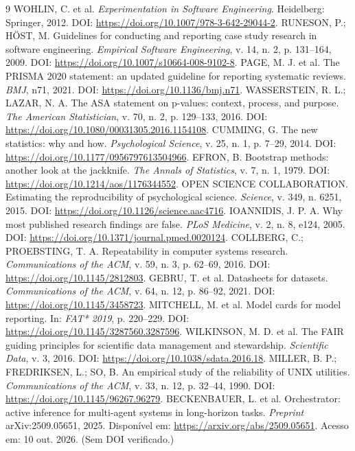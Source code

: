 \begin{thebibliography}{9}
 WOHLIN, C. et al. \textit{Experimentation in Software Engineering}. Heidelberg: Springer, 2012. DOI: \url{https://doi.org/10.1007/978-3-642-29044-2}.
 RUNESON, P.; HÖST, M. Guidelines for conducting and reporting case study research in software engineering. \textit{Empirical Software Engineering}, v. 14, n. 2, p. 131--164, 2009. DOI: \url{https://doi.org/10.1007/s10664-008-9102-8}.
 PAGE, M. J. et al. The PRISMA 2020 statement: an updated guideline for reporting systematic reviews. \textit{BMJ}, n71, 2021. DOI: \url{https://doi.org/10.1136/bmj.n71}.
 WASSERSTEIN, R. L.; LAZAR, N. A. The ASA statement on p-values: context, process, and purpose. \textit{The American Statistician}, v. 70, n. 2, p. 129--133, 2016. DOI: \url{https://doi.org/10.1080/00031305.2016.1154108}.
 CUMMING, G. The new statistics: why and how. \textit{Psychological Science}, v. 25, n. 1, p. 7--29, 2014. DOI: \url{https://doi.org/10.1177/0956797613504966}.
 EFRON, B. Bootstrap methods: another look at the jackknife. \textit{The Annals of Statistics}, v. 7, n. 1, 1979. DOI: \url{https://doi.org/10.1214/aos/1176344552}.
 OPEN SCIENCE COLLABORATION. Estimating the reproducibility of psychological science. \textit{Science}, v. 349, n. 6251, 2015. DOI: \url{https://doi.org/10.1126/science.aac4716}.
 IOANNIDIS, J. P. A. Why most published research findings are false. \textit{PLoS Medicine}, v. 2, n. 8, e124, 2005. DOI: \url{https://doi.org/10.1371/journal.pmed.0020124}.
 COLLBERG, C.; PROEBSTING, T. A. Repeatability in computer systems research. \textit{Communications of the ACM}, v. 59, n. 3, p. 62--69, 2016. DOI: \url{https://doi.org/10.1145/2812803}.
 GEBRU, T. et al. Datasheets for datasets. \textit{Communications of the ACM}, v. 64, n. 12, p. 86--92, 2021. DOI: \url{https://doi.org/10.1145/3458723}.
 MITCHELL, M. et al. Model cards for model reporting. In: \textit{FAT* 2019}, p. 220--229. DOI: \url{https://doi.org/10.1145/3287560.3287596}.
 WILKINSON, M. D. et al. The FAIR guiding principles for scientific data management and stewardship. \textit{Scientific Data}, v. 3, 2016. DOI: \url{https://doi.org/10.1038/sdata.2016.18}.
 MILLER, B. P.; FREDRIKSEN, L.; SO, B. An empirical study of the reliability of UNIX utilities. \textit{Communications of the ACM}, v. 33, n. 12, p. 32--44, 1990. DOI: \url{https://doi.org/10.1145/96267.96279}.
 BECKENBAUER, L. et al. Orchestrator: active inference for multi-agent systems in long-horizon tasks. \textit{Preprint} arXiv:2509.05651, 2025. Disponível em: \url{https://arxiv.org/abs/2509.05651}. Acesso em: 10 out. 2026. (Sem DOI verificado.)
\end{thebibliography}
